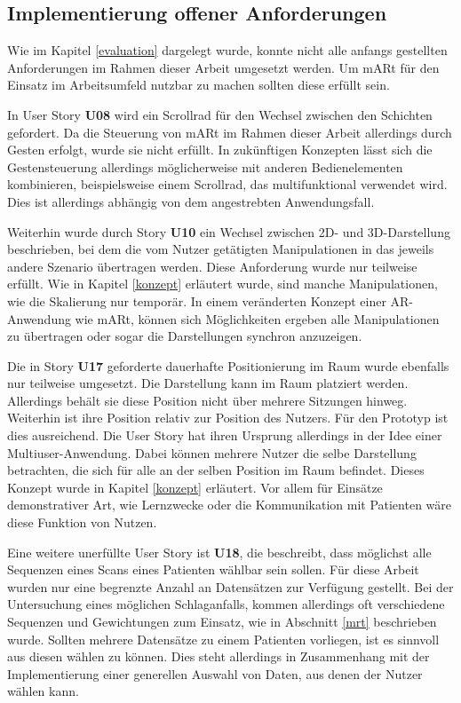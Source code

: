 \subsection{Implementierung offener  Anforderungen}

Wie im Kapitel \ref{evaluation} dargelegt wurde, konnte nicht alle anfangs gestellten Anforderungen im Rahmen dieser Arbeit umgesetzt werden. Um mARt für den Einsatz im Arbeitsumfeld nutzbar zu machen sollten diese erfüllt sein.

In User Story \textbf{U08} wird ein Scrollrad für den Wechsel zwischen den Schichten gefordert. Da die Steuerung von mARt im Rahmen dieser Arbeit allerdings durch Gesten erfolgt, wurde sie nicht erfüllt. In zukünftigen Konzepten lässt sich die Gestensteuerung allerdings möglicherweise mit anderen Bedienelementen kombinieren, beispielsweise einem Scrollrad, das multifunktional verwendet wird. Dies ist allerdings abhängig von dem angestrebten Anwendungsfall.

Weiterhin wurde durch Story \textbf{U10} ein Wechsel zwischen 2D- und 3D-Darstellung beschrieben, bei dem die vom Nutzer getätigten Manipulationen in das jeweils andere Szenario übertragen werden. Diese Anforderung wurde nur teilweise erfüllt. Wie in Kapitel \ref{konzept} erläutert wurde, sind manche Manipulationen, wie die Skalierung nur temporär. In einem veränderten Konzept einer AR-Anwendung wie mARt, können sich Möglichkeiten ergeben alle Manipulationen zu übertragen oder sogar die Darstellungen synchron anzuzeigen.

Die in Story \textbf{U17} geforderte dauerhafte Positionierung im Raum wurde ebenfalls nur teilweise umgesetzt. Die Darstellung kann im Raum platziert werden. Allerdings behält sie diese Position nicht über mehrere Sitzungen hinweg. 
Weiterhin ist ihre Position relativ zur Position des Nutzers. Für den Prototyp ist dies ausreichend. Die User Story hat ihren Ursprung allerdings in der Idee einer Multiuser-Anwendung. Dabei können mehrere Nutzer die selbe Darstellung betrachten, die sich für alle an der selben Position im Raum befindet. Dieses Konzept wurde in Kapitel \ref{konzept} erläutert. Vor allem für Einsätze demonstrativer Art, wie Lernzwecke oder die Kommunikation mit Patienten wäre diese Funktion von Nutzen.

Eine weitere unerfüllte User Story ist \textbf{U18}, die beschreibt, dass möglichst alle Sequenzen eines Scans eines Patienten wählbar sein sollen. Für diese Arbeit wurden nur eine begrenzte Anzahl an Datensätzen zur Verfügung gestellt. Bei der Untersuchung eines möglichen Schlaganfalls, kommen allerdings oft verschiedene Sequenzen und Gewichtungen zum Einsatz, wie in Abschnitt \ref{mrt} beschrieben wurde. Sollten mehrere Datensätze zu einem Patienten vorliegen, ist es sinnvoll aus diesen wählen zu können. Dies steht allerdings in Zusammenhang mit der Implementierung einer generellen Auswahl von Daten, aus denen der Nutzer wählen kann.

